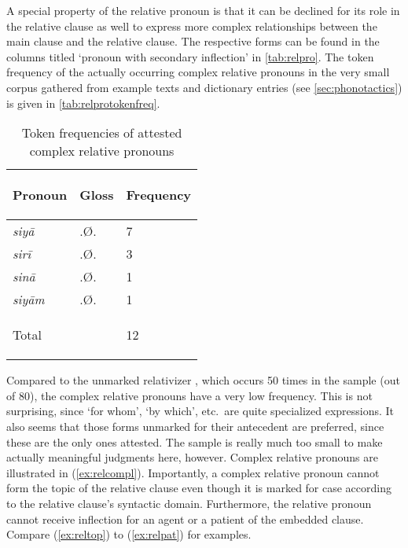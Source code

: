 A special property of the relative pronoun is that it can be declined for its 
role in the relative clause as well to express more complex relationships 
between the main clause and the relative clause. The respective forms can be 
found in the columns titled `pronoun with secondary inflection' in 
\autoref{tab:relpro}. The token frequency of the actually occurring complex 
relative pronouns in the very small corpus gathered from example texts and 
dictionary entries (see \autoref{sec:phonotactics}) is given in 
\autoref{tab:relprotokenfreq}.

\begin{table}[tp]\centering
\caption{Token frequencies of attested complex relative pronouns}

\begin{tabu} to .75
\tableheaderfont\toprule

Pronoun & Gloss & Frequency \\

\toprule

siyā	& \Rel{}.Ø.\Loc{} & 7 \\
sirī	& \Rel{}.Ø.\Ins{} & 3 \\
sinā	& \Rel{}.Ø.\Gen{} & 1 \\
siyām	& \Rel{}.Ø.\Dat{} & 1 \\

\bottomrule

\textup{Total}	& & 12 \\

\bottomrule
\end{tabu}
\label{tab:relprotokenfreq}
\end{table}

Compared to the unmarked relativizer , which occurs 50 times in
the sample (out of 80), the complex relative pronouns have a very low
frequency. This is not surprising, since `for whom', `by which', etc.\ are
quite specialized expressions. It also seems that those forms unmarked for
their antecedent are preferred, since these are the only ones attested. The
sample is really much too small to make actually meaningful judgments here,
however. Complex relative pronouns are illustrated in (\ref{ex:relcompl}).
Importantly, a complex relative pronoun cannot form the topic of the relative
clause even though it is marked for case according to the relative clause's
syntactic domain. Furthermore, the relative pronoun cannot receive inflection
for an agent or a patient of the embedded clause. Compare (\ref{ex:reltop}) to
(\ref{ex:relpat}) for examples.

